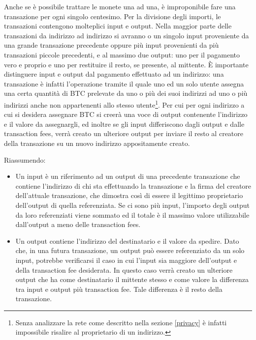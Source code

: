 Anche se è possibile trattare le monete una ad una, è improponibile fare una transazione per ogni singolo centesimo. Per la divisione degli importi, le transazioni contengono molteplici input e output. Nella maggior parte delle transazioni da indirizzo ad indirizzo si avranno o un singolo input proveniente da una grande transazione precedente oppure più input provenienti da più transazioni piccole precedenti, e al massimo due output: uno per il pagamento vero e proprio e uno per restituire il resto, se presente, al mittente. È importante distinguere input e output dal pagamento effettuato ad un indirizzo: una transazione è infatti l'operazione tramite il quale uno ed un solo utente assegna una certa quantità di BTC prelevate da uno o più dei suoi indirizzi ad uno o più indirizzi anche non appartenenti allo stesso utente\footnote{Senza analizzare la rete come descritto nella sezione \ref{privacy} è infatti impossibile risalire al proprietario di un indirizzo.}. Per cui per ogni indirizzo a cui si desidera assegnare BTC si creerà una voce di output contenente l'indirizzo e il valore da assegnargli, ed inoltre se gli input differiscono dagli output e dalle transaction fees, verrà creato un ulteriore output per inviare il resto al creatore della transazione su un nuovo indirizzo appositamente creato.

Riassumendo:

\begin{itemize}
\itemsep1pt\parskip0pt
\item
  Un input è un riferimento ad un output di una precedente transazione   che contiene l'indirizzo di chi sta effettuando la transazione e la firma del creatore dell'attuale transazione, che dimostra così di essere il legittimo proprietario dell'output di quella referenziata. Se ci   sono più input, l'importo degli output da loro referenziati viene   sommato ed il totale è il massimo valore utilizzabile dall'output a meno delle transaction fees.
\item
  Un output contiene l'indirizzo del destinatario e il valore da   spedire. Dato che, in una futura transazione, un output può essere referenziato da un solo input, potrebbe verificarsi il caso in cui l'input sia maggiore dell'output e della transaction fee desiderata. In questo caso verrà creato un ulteriore output che ha come destinatario il mittente stesso e come valore la differenza tra input e output più transaction fee. Tale differenza è il resto della transazione.
\end{itemize}

